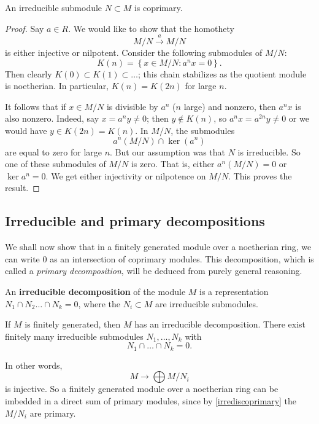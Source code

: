 \begin{proposition} \label{irrediscoprimary}
An irreducible submodule $N \subset M$ is coprimary.
\end{proposition} 
\begin{proof} 
Say $a \in R$. We would like to show that the homothety 
\[ M/N \stackrel{a}{\to} M/N  \]
is either injective or nilpotent.
Consider  the following submodules of $M/N$:
\[ K(n) =  \left\{x \in M/N: a^n x = 0\right\} . \]
Then clearly $K(0) \subset K(1) \subset \dots$; this chain stabilizes  as
the quotient module is noetherian.
In particular, $K(n) = K(2n)$ for large $n$. 

It follows that if $x \in M/N$ is divisible by $a^n$ ($n$ large) and nonzero, then $a^n x$
is also nonzero. Indeed, say $x = a^n y \neq 0$; then $y \notin K(n)$, so $a^{n}x =
a^{2n}y \neq 0$ or we would have $y \in K(2n) = K(n)$. In $M/N$, the submodules
\[ a^n(M/N) \cap \ker(a^n)  \]
are equal to zero for large $n$. But our assumption was that $N$ is
irreducible.  So one of these submodules of $M/N$ is zero. That is, either
$a^n(M/N) = 0$ or $\ker a^n = 0$. We get either injectivity or nilpotence on
$M/N$. This proves the result.
\end{proof} 
 
\subsection{Irreducible and primary decompositions}

We shall now show that in a finitely generated module over a noetherian ring,
we can write $0$ as an intersection of coprimary modules. This decomposition,
which is called a \emph{primary decomposition}, will be deduced from purely
general reasoning.

\begin{definition} 
An \textbf{irreducible decomposition} of the module $M$ is a representation
$N_1 \cap N_2 \dots \cap N_k  = 0$, where the $N_i \subset M$ are irreducible
submodules.
\end{definition} 

\begin{proposition} 
If $M$ is finitely generated, then $M$ has an irreducible decomposition. There exist finitely many irreducible
submodules $N_1, \dots, N_k$ with
\[  N_1 \cap \dots \cap N_k = 0. \]
\end{proposition} 
In other words,
\[  M \to \bigoplus M/N_i  \]
is injective.
So a finitely generated module over a noetherian ring can be imbedded in a direct sum of
primary modules, since by \cref{irrediscoprimary} the $M/N_i$ are
primary. 


